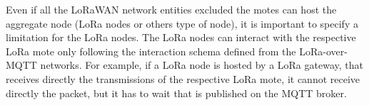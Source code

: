 Even if all the LoRaWAN network entities excluded the motes can host the aggregate node (LoRa nodes or others type of node), it is important to specify a limitation for the LoRa nodes. 
The LoRa nodes can interact with the respective LoRa mote only following the interaction schema defined from the LoRa-over-MQTT networks. 
For example, if a LoRa node is hosted by a LoRa gateway, that receives directly the transmissions of the respective LoRa mote, it cannot receive directly the packet, but it has to wait that is published on the MQTT broker.

